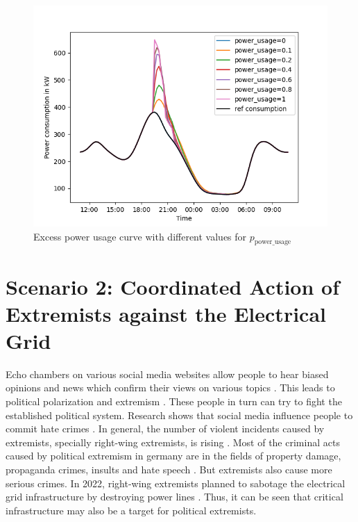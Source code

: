 \begin{figure}[!ht]
    \centering
    \includegraphics[scale=.6]{figs/eval/scenario1/powerusage.png}
    \caption{Excess power usage curve with different values for 
    $p_{\mathrm{power\_usage}}$}
    \label{scen1variablepowerusage} 
\end{figure}

\section{Scenario 2: Coordinated Action of Extremists 
against the Electrical Grid}

Echo chambers on various social media websites allow people to 
hear biased opinions and news which confirm their views on 
various topics \cite{terren2021echo}. This leads to political
polarization and extremism \cite{van2022banality}.
These people in turn can try to fight the established political
system. Research shows that social media influence people
to commit hate crimes \cite{muller2021fanning}.
In general, the number of violent incidents caused by
extremists, specially right-wing extremists, is rising 
\cite{koehler2016right}. 
Most of the criminal acts caused by political extremism 
in germany are in the fields of property damage, 
propaganda crimes, insults and hate speech \cite{bmicrimestatistics}.
But extremists also cause more serious crimes. In 2022,
right-wing extremists planned to sabotage the electrical grid 
infrastructure by destroying power lines \cite{anschlagstrom}.
Thus, it can be seen that critical infrastructure may also be a target
for political extremists. 

